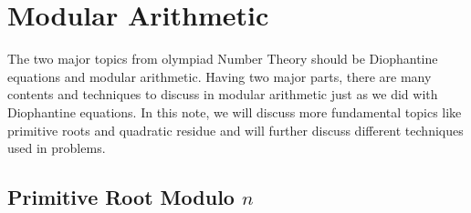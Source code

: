 \documentclass[../../../main.tex]{subfiles}
\begin{document}
\chapter{Modular Arithmetic}

The two major topics from olympiad Number Theory should be
Diophantine equations and modular arithmetic. Having two major
parts, there are many contents and techniques to discuss in
modular arithmetic just as we did with Diophantine equations.
In this note, we will discuss more fundamental topics like
primitive roots and quadratic residue and will further discuss
different techniques used in problems.

\section{Primitive Root Modulo \texorpdfstring{$n$}{n}}
\end{document}
